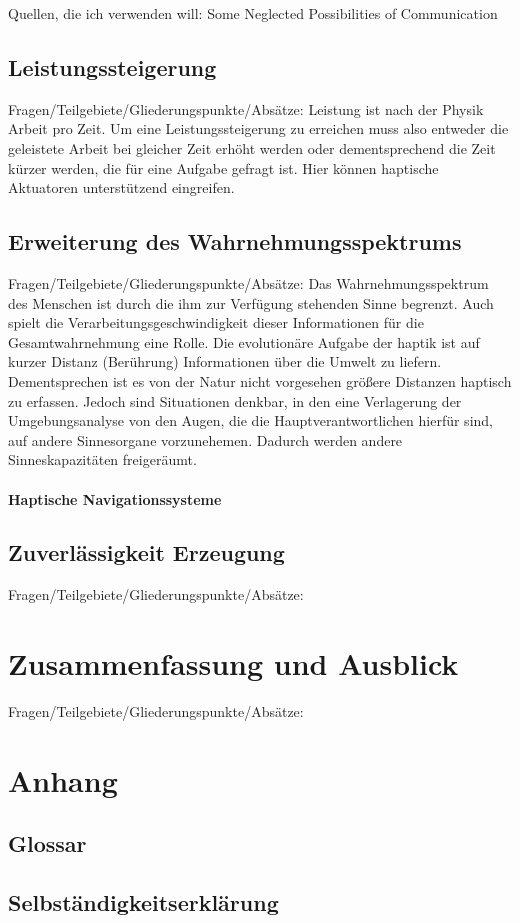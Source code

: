 \documentclass{llncs}					%
\begin{document}
Quellen, die ich verwenden will:
Some Neglected Possibilities of Communication\cite{10.2307/1705360}

\subsection{Leistungssteigerung}
Fragen/Teilgebiete/Gliederungspunkte/Absätze:
Leistung ist nach der Physik Arbeit pro Zeit. Um eine Leistungssteigerung zu erreichen muss also entweder die geleistete Arbeit bei gleicher Zeit erhöht werden oder dementsprechend die Zeit kürzer werden, die für eine Aufgabe gefragt ist.
Hier können haptische Aktuatoren unterstützend eingreifen.


\subsection{Erweiterung des Wahrnehmungsspektrums}
Fragen/Teilgebiete/Gliederungspunkte/Absätze:
Das Wahrnehmungsspektrum des Menschen ist durch die ihm zur Verfügung stehenden Sinne begrenzt. Auch spielt die Verarbeitungsgeschwindigkeit dieser Informationen für die Gesamtwahrnehmung eine Rolle.
Die evolutionäre Aufgabe der haptik ist auf kurzer Distanz (Berührung) Informationen über die Umwelt zu liefern. Dementsprechen ist es von der Natur nicht vorgesehen größere Distanzen haptisch zu erfassen.
Jedoch sind Situationen denkbar, in den eine Verlagerung der Umgebungsanalyse von den Augen, die die Hauptverantwortlichen hierfür sind, auf andere Sinnesorgane vorzunehemen. Dadurch werden andere Sinneskapazitäten freigeräumt.

\paragraph{Haptische Navigationssysteme}

\subsection{Zuverlässigkeit Erzeugung}
Fragen/Teilgebiete/Gliederungspunkte/Absätze:

\section{Zusammenfassung und Ausblick}
Fragen/Teilgebiete/Gliederungspunkte/Absätze:

\section{Anhang}

\clearpage
\subsection{Glossar}\label{glossar}

\renewcommand*{\glossarysection}[2][]{}	%
\printnoidxglossaries				%

\subsection{Selbständigkeitserklärung}

\clearpage

\end{document}
